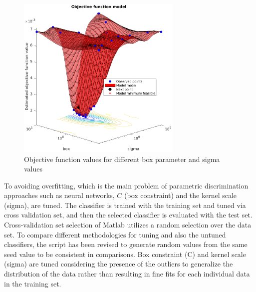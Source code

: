 \begin{figure}
\begin{center}
\includegraphics[width=0.7\textwidth]{figures/objFuncModel}    %
\caption{Objective function values for different box parameter and sigma values} 
\label{fig:objFuncModel}
\end{center}
\end{figure}

To avoiding overfitting, which is the main problem of parametric discrimination approaches such as neural networks, $C$ (box constraint) and the kernel scale (sigma), are tuned.
The classifier is trained with the training set and tuned via cross validation set, and then the selected classifier is evaluated with the test set. Cross-validation set selection of Matlab utilizes a random selection over the data set. 
To compare different methodologies for tuning and also the untuned classifiers, the script has been revised to generate random values from the same seed value to be consistent in comparisons.
Box constraint (C) and kernel scale (sigma) are tuned considering the presence of the outliers to generalize the distribution of the data rather than resulting in fine fits for each individual data in the training set. 

